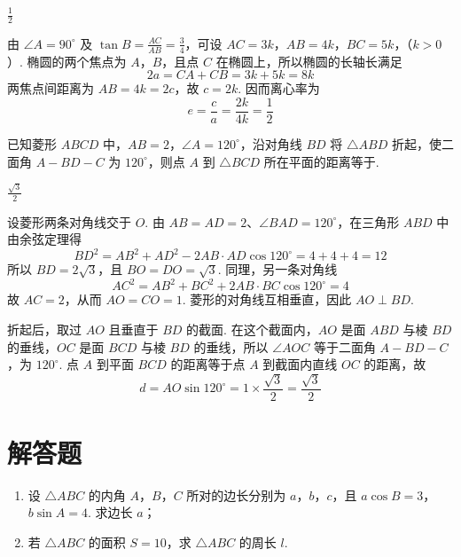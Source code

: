 \begin{answer}
\(\frac{1}{2}\)
\end{answer}

\begin{solution}
由 \(\angle A=90^{\circ}\) 及 \(\tan B=\frac{AC}{AB}=\frac34\)，可设
\(AC=3k\)，\(AB=4k\)，\(BC=5k\)，（\(k>0\)）.
椭圆的两个焦点为 \(A\)，\(B\)，且点 \(C\) 在椭圆上，所以椭圆的长轴长满足
\[
2a=CA+CB=3k+5k=8k
\]
两焦点间距离为 \(AB=4k=2c\)，故 \(c=2k\). 因而离心率为
\[
e=\frac{c}{a}=\frac{2k}{4k}=\frac12
\]
\end{solution}

\begin{problem}
已知菱形 \(ABCD\) 中，\(AB = 2\)，\(\angle A = 120^{\circ}\)，沿对角线 \(BD\) 将 \(\triangle ABD\) 折起，使二面角 \(A - BD - C\) 为 \(120^{\circ}\)，则点 \(A\) 到 \(\triangle BCD\) 所在平面的距离等于\fillinblank{}.
\end{problem}

\begin{answer}
\(\frac{\sqrt{3}}{2}\)
\end{answer}

\begin{solution}
设菱形两条对角线交于 \(O\). 由 \(AB=AD=2\)、\(\angle BAD=120^{\circ}\)，在三角形 \(ABD\) 中由余弦定理得
\[
BD^2=AB^2+AD^2-2AB\cdot AD\cos120^{\circ}=4+4+4=12
\]
所以 \(BD=2\sqrt3\)，且 \(BO=DO=\sqrt3\). 同理，另一条对角线
\[
AC^2=AB^2+BC^2+2AB\cdot BC\cos120^{\circ}=4
\]
故 \(AC=2\)，从而 \(AO=CO=1\). 菱形的对角线互相垂直，因此 \(AO\perp BD\).

折起后，取过 \(AO\) 且垂直于 \(BD\) 的截面. 在这个截面内，\(AO\) 是面 \(ABD\) 与棱 \(BD\) 的垂线，\(OC\) 是面 \(BCD\) 与棱 \(BD\) 的垂线，所以 \(\angle AOC\) 等于二面角 \(A-BD-C\)，为 \(120^{\circ}\). 点 \(A\) 到平面 \(BCD\) 的距离等于点 \(A\) 到截面内直线 \(OC\) 的距离，故
\[
d=AO\sin120^{\circ}=1\times\frac{\sqrt3}{2}=\frac{\sqrt3}{2}
\]
\end{solution}

\section{解答题}

\begin{problem}
\begin{enumerate}
\item 设 \(\triangle ABC\) 的内角 \(A\)，\(B\)，\(C\) 所对的边长分别为 \(a\)，\(b\)，\(c\)，且 \(a \cos B = 3\)，\(b \sin A = 4\). 求边长 \(a\)；
\item 若 \(\triangle ABC\) 的面积 \(S = 10\)，求 \(\triangle ABC\) 的周长 \(l\).
\end{enumerate}
\end{problem}

